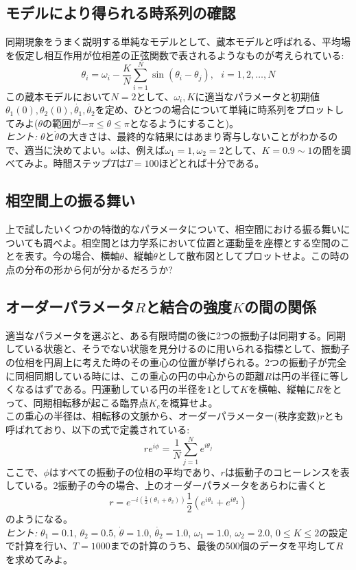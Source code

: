 \documentclass{jsarticle}
\begin{document}
\subsection{モデルにより得られる時系列の確認}
    同期現象をうまく説明する単純なモデルとして、蔵本モデルと呼ばれる、平均場を仮定し相互作用が位相差の正弦関数で表されるようなものが考えられている:
    $$\theta_{i} = \omega_{i}- \frac{K}{N}\sum_{i=1}^{N}\sin(\theta_{i}-\theta_{j}),\ \ \ i=1,2,\dots ,N$$  
    この蔵本モデルにおいて$N=2$として、$\omega_{i},K$に適当なパラメータと初期値$\theta_{1}(0), \theta_{2}(0), \dot{\theta_{1}}, \dot{\theta_{2}}$を定め、ひとつの場合について単純に時系列をプロットしてみよ($\theta$の範囲が$-\pi \le \theta \le \pi$となるようにすること)。\\
    \emph{ヒント:}  $\theta$と$\dot{\theta}$の大きさは、最終的な結果にはあまり寄与しないことがわかるので、適当に決めてよい。$\omega$は、例えば$\omega_{1} = 1, \omega_{2} = 2$として、$K=0.9\sim 1$の間を調べてみよ。時間ステップ$T$は$T=100$ほどとれば十分である。

\subsection{相空間上の振る舞い}
    上で試したいくつかの特徴的なパラメータについて、相空間における振る舞いについても調べよ。相空間とは力学系において位置と運動量を座標とする空間のことを表す。今の場合、横軸$\theta$、縦軸$\dot{\theta}$として散布図としてプロットせよ。この時の点の分布の形から何が分かるだろうか?

\subsection{オーダーパラメータ$R$と結合の強度$K$の間の関係}
    適当なパラメータを選ぶと、ある有限時間の後に2つの振動子は同期する。同期している状態と、そうでない状態を見分けるのに用いられる指標として、振動子の位相を円周上に考えた時のその重心の位置が挙げられる。2つの振動子が完全に同相同期している時には、この重心の円の中心からの距離$R$は円の半径に等しくなるはずである。円運動している円の半径を$1$として$K$を横軸、縦軸に$R$をとって、同期相転移が起こる臨界点$K_{c}$を概算せよ。\\
    この重心の半径は、相転移の文脈から、オーダーパラメーター(秩序変数)$r$とも呼ばれており、以下の式で定義されている:
    $$re^{i\phi} = \frac{1}{N}\sum_{j=1}^{N} e^{i\theta_{j}}$$
    ここで、$\phi$はすべての振動子の位相の平均であり、$r$は振動子のコヒーレンスを表している。2振動子の今の場合、上のオーダーパラメータをあらわに書くと
    $$r = e^{-i\left(\frac{1}{2}(\theta_{1} + \theta_{2})\right)} \frac{1}{2} (e^{i\theta_{1}} + e^{i\theta_{2}})$$
    のようになる。\\
    \emph{ヒント:} $\theta_{1}=0.1$, $\theta_{2}=0.5$, $\dot{\theta}=1.0$, $\dot{\theta_{2}} = 1.0$, $\omega_{1} = 1.0$, $\omega_{2} = 2.0$, $0\le K \le 2$の設定で計算を行い、$T=1000$までの計算のうち、最後の500個のデータを平均して$R$を求めてみよ。
\end{document}
